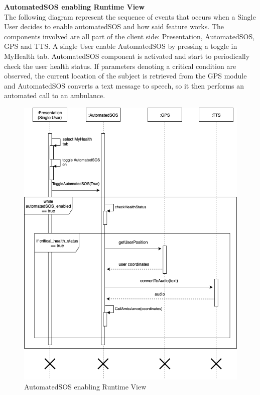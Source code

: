\documentclass[titlepage]{article}
\begin{document}
{\bf AutomatedSOS enabling Runtime View }\\ 
The following diagram represent the sequence of events that occurs when a Single User decides to enable automatedSOS and how said feature works.
The components involved are all part of the client side: Presentation, AutomatedSOS, GPS and TTS. A single User enable AutomatedSOS by pressing a toggle in MyHealth tab.
AutomatedSOS component is activated and start to periodically check the user health status. If parameters denoting a critical condition are observed, the current location of the subject is retrieved from the GPS module and AutomatedSOS converts a text message to speech, so it then performs an automated call to an ambulance.

\begin{figure}[H]
	\center
  	\includegraphics[width=13cm]{SOS.png}
  	\caption{AutomatedSOS enabling Runtime View}
 	\label{fig:SOS}
\end{figure}
\end{document}
